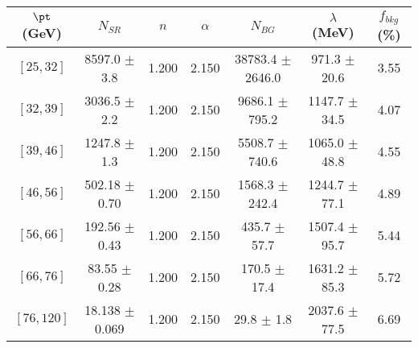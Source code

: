 \begin{tabular}{c||c|c|c|c|c||c}
$\pt$ (GeV) & $N_{SR}$ & $n$ & $\alpha$ & $N_{BG}$  & $\lambda$ (MeV) & $f_{bkg}$ (\%) \\
\hline
$[25, 32]$ & 8597.0 $\pm$ 3.8 & 1.200 & 2.150 & 38783.4 $\pm$ 2646.0 & 971.3 $\pm$ 20.6 & 3.55\\
$[32, 39]$ & 3036.5 $\pm$ 2.2 & 1.200 & 2.150 & 9686.1 $\pm$ 795.2 & 1147.7 $\pm$ 34.5 & 4.07\\
$[39, 46]$ & 1247.8 $\pm$ 1.3 & 1.200 & 2.150 & 5508.7 $\pm$ 740.6 & 1065.0 $\pm$ 48.8 & 4.55\\
$[46, 56]$ & 502.18 $\pm$ 0.70 & 1.200 & 2.150 & 1568.3 $\pm$ 242.4 & 1244.7 $\pm$ 77.1 & 4.89\\
$[56, 66]$ & 192.56 $\pm$ 0.43 & 1.200 & 2.150 & 435.7 $\pm$ 57.7 & 1507.4 $\pm$ 95.7 & 5.44\\
$[66, 76]$ & 83.55 $\pm$ 0.28 & 1.200 & 2.150 & 170.5 $\pm$ 17.4 & 1631.2 $\pm$ 85.3 & 5.72\\
$[76, 120]$ & 18.138 $\pm$ 0.069 & 1.200 & 2.150 & 29.8 $\pm$ 1.8 & 2037.6 $\pm$ 77.5 & 6.69\\
\end{tabular}
